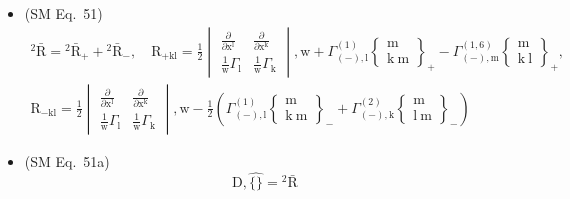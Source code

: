 \documentclass[
    12pt,              %
    a4paper,           %
    headings=normal,   %
    twoside=true,      %
    BCOR=8mm,          %
]{scrbook}
\begin{document}
\begin{itemize}[label={},leftmargin=0pt]
    \item (SM Eq.\ 51) 
    \[
    \begin{gathered}
    {}^2\bar{\mathrm{R}} = {}^2\bar{\mathrm{R}}_+ + {}^2\bar{\mathrm{R}}_-, \quad \mathrm{R}_{\mathrm{+kl}} = \frac{1}{2}\begin{vmatrix} \frac{\partial}{\partial \mathrm{x^l}} & \frac{\partial}{\partial \mathrm{x^k}} \\ \frac{1}{\mathrm{w}}\Gamma_\mathrm{l} & \frac{1}{\mathrm{w}}\Gamma_\mathrm{k} \end{vmatrix}, \mathrm{w} + \Gamma^{(1)}_{(-),\mathrm{l}} \left\{ \begin{smallmatrix} \mathrm{m} \\ \mathrm{k\ m} \end{smallmatrix} \right\} _+ - \Gamma^{(1,6)}_{(-),\mathrm{m}} \left\{ \begin{smallmatrix} \mathrm{m} \\ \mathrm{k\ l} \end{smallmatrix} \right\}_+, \\
    \mathrm{R}_{\mathrm{-kl}} = \frac{1}{2}\begin{vmatrix} \frac{\partial}{\partial \mathrm{x^l}} & \frac{\partial}{\partial \mathrm{x^k}} \\ \frac{1}{\mathrm{w}}\Gamma_\mathrm{l} & \frac{1}{\mathrm{w}}\Gamma_\mathrm{k} \end{vmatrix}, \mathrm{w} - \frac{1}{2}\left( \Gamma^{(1)}_{(-),\mathrm{l}} \left\{ \begin{smallmatrix} \mathrm{m} \\ \mathrm{k\ m} \end{smallmatrix} \right\}_- + \Gamma^{(2)}_{(-),\mathrm{k}} \left\{ \begin{smallmatrix} \mathrm{m} \\ \mathrm{l\ m} \end{smallmatrix} \right\}_- \right)
    \end{gathered}
    \]

    \item (SM Eq.\ 51a) 
    \[
    \mathrm{D}, \widehat{\{\}} = {}^2\bar{\mathrm{R}}
    \]


\end{itemize}
\end{document}
